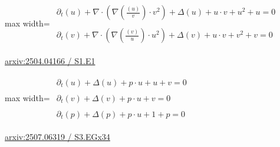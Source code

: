 \documentclass[UTF8,10pt,a4paper,fontset=mac]{ctexart}
\begin{document}
\begin{minipage}{\linewidth}\begin{center}\begin{adjustbox}{max width=\linewidth}$\displaystyle\begin{gathered}\begin{gathered}\partial_{t}(u)+\nabla\cdot(\nabla(\frac{(u)}{v})\cdot v^{2})+\Delta(u)+u\cdot v+u^{2}+u=0\end{gathered}\\[5pt]\begin{gathered}\partial_{t}(v)+\nabla\cdot(\nabla(\frac{(v)}{u})\cdot u^{2})+\Delta(v)+u\cdot v+v^{2}+v=0\end{gathered}\end{gathered}$\end{adjustbox}\end{center}{\small\href{https://arxiv.org/html/2504.04166#S1.E1}{arxiv:2504.04166 / S1.E1}}\par\end{minipage}\par\vspace{6mm}

\begin{minipage}{\linewidth}\begin{center}\begin{adjustbox}{max width=\linewidth}$\displaystyle\begin{gathered}\begin{gathered}\partial_{t}(u)+\Delta(u)+p\cdot u+u+v=0\end{gathered}\\[5pt]\begin{gathered}\partial_{t}(v)+\Delta(v)+p\cdot u+v=0\end{gathered}\\[5pt]\begin{gathered}\partial_{t}(p)+\Delta(p)+p\cdot u+1+p=0\end{gathered}\end{gathered}$\end{adjustbox}\end{center}{\small\href{https://arxiv.org/html/2507.06319#S3.EGx34}{arxiv:2507.06319 / S3.EGx34}}\par\end{minipage}\par\vspace{6mm}
\end{document}
